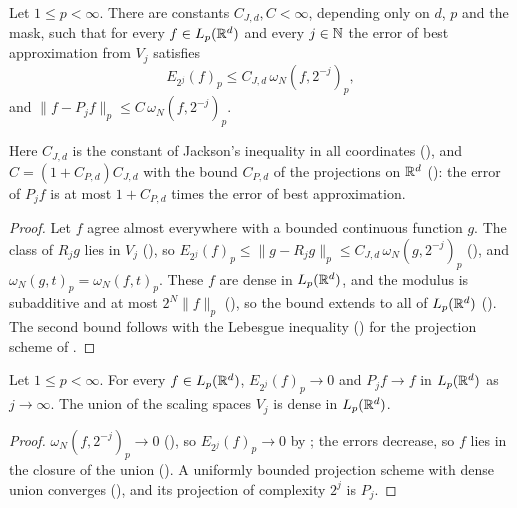 \begin{theorem}
\label{thm:daub-rd-direct-estimate}
\leanok
{}
Let $1 \leq p < \infty$. There are constants $C_{J,d}, C < \infty$, depending only on $d$, $p$
and the mask, such that for every $f \in L_p(\mathbb{R}^d)$ and every $j \in \mathbb{N}$ the error of best
approximation from $V_j$ satisfies
\[
  E_{2^j}(f)_p \leq C_{J,d} \, \omega_N(f, 2^{-j})_p ,
\]
and $\|f - P_j f\|_p \leq C \, \omega_N(f, 2^{-j})_p$.
\end{theorem}

Here $C_{J,d}$ is the constant of Jackson's inequality in all coordinates
(), and $C = (1 + C_{P,d}) C_{J,d}$ with the bound $C_{P,d}$ of
the projections on $\mathbb{R}^d$ (): the error of $P_j f$ is at most
$1 + C_{P,d}$ times the error of best approximation.

\begin{proof}
\leanok
{}
Let $f$ agree almost everywhere with a bounded continuous function $g$. The class of $R_j g$ lies
in $V_j$ (), so
$E_{2^j}(f)_p \leq \|g - R_j g\|_p \leq C_{J,d} \, \omega_N(g, 2^{-j})_p$
(), and $\omega_N(g, t)_p = \omega_N(f, t)_p$. These $f$ are dense
in $L_p(\mathbb{R}^d)$, and the modulus is subadditive and at most $2^N \|f\|_p$ (),
so the bound extends to all of $L_p(\mathbb{R}^d)$ (). The second bound follows with
the Lebesgue inequality () for the projection scheme of
.
\end{proof}

\begin{corollary}
\label{cor:daub-rd-density}
\leanok
{}
Let $1 \leq p < \infty$. For every $f \in L_p(\mathbb{R}^d)$, $E_{2^j}(f)_p \to 0$ and $P_j f \to f$ in
$L_p(\mathbb{R}^d)$ as $j \to \infty$. The union of the scaling spaces $V_j$ is dense in $L_p(\mathbb{R}^d)$.
\end{corollary}

\begin{proof}
\leanok
{}
$\omega_N(f, 2^{-j})_p \to 0$ (), so $E_{2^j}(f)_p \to 0$ by
; the errors decrease, so $f$ lies in the closure of the union
(). A uniformly bounded projection scheme with dense union converges
(), and its projection of complexity $2^j$ is $P_j$.
\end{proof}

